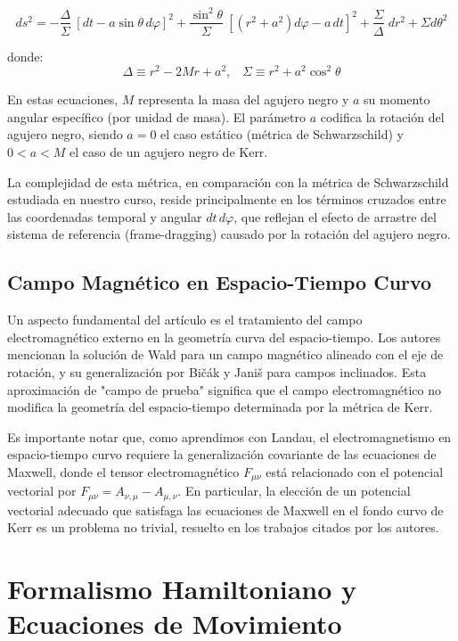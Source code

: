 \documentclass[a4paper,12pt]{article}
\begin{document}
\begin{equation}
ds^2=-\frac{\Delta}{\Sigma}\:[dt-a\sin{\theta}\,d\varphi]^2+\frac{\sin^2{\theta}}{\Sigma}\:[(r^2+a^2)d\varphi-a\,dt]^2+\frac{\Sigma}{\Delta}\;dr^2+\Sigma d\theta^2
\end{equation}

donde:
\begin{equation}
{\Delta}\equiv{}r^2-2Mr+a^2,\;\;\;
\Sigma\equiv{}r^2+a^2\cos^2\theta
\end{equation}

En estas ecuaciones, $M$ representa la masa del agujero negro y $a$ su momento angular específico (por unidad de masa). El parámetro $a$ codifica la rotación del agujero negro, siendo $a=0$ el caso estático (métrica de Schwarzschild) y $0<a<M$ el caso de un agujero negro de Kerr.

La complejidad de esta métrica, en comparación con la métrica de Schwarzschild estudiada en nuestro curso, reside principalmente en los términos cruzados entre las coordenadas temporal y angular $dt\,d\varphi$, que reflejan el efecto de arrastre del sistema de referencia (frame-dragging) causado por la rotación del agujero negro.

\subsection{Campo Magnético en Espacio-Tiempo Curvo}

Un aspecto fundamental del artículo es el tratamiento del campo electromagnético externo en la geometría curva del espacio-tiempo. Los autores mencionan la solución de Wald para un campo magnético alineado con el eje de rotación, y su generalización por Bičák y Janiš para campos inclinados. Esta aproximación de "campo de prueba" significa que el campo electromagnético no modifica la geometría del espacio-tiempo determinada por la métrica de Kerr.

Es importante notar que, como aprendimos con Landau, el electromagnetismo en espacio-tiempo curvo requiere la generalización covariante de las ecuaciones de Maxwell, donde el tensor electromagnético $F_{\mu\nu}$ está relacionado con el potencial vectorial por $F_{\mu\nu}=A_{\nu,\mu}-A_{\mu,\nu}$. En particular, la elección de un potencial vectorial adecuado que satisfaga las ecuaciones de Maxwell en el fondo curvo de Kerr es un problema no trivial, resuelto en los trabajos citados por los autores.

\section{Formalismo Hamiltoniano y Ecuaciones de Movimiento}
\end{document}
